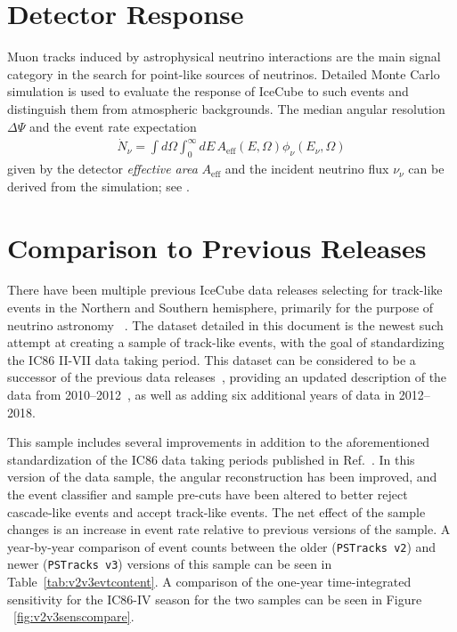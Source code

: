 \documentclass[aps,10pt,prd,twocolumn,floats,letterpaper,showpacs,nofootinbib,bibnotes,notitlepage,superscriptaddress,floatfix]{revtex4-1}
\newcommand{\MA}[1]{{\color{black}#1}}
\begin{document}

\section{Detector Response}\label{secIII}

Muon tracks induced by astrophysical neutrino interactions are the main signal category in the search for point-like sources of neutrinos. Detailed Monte Carlo simulation is used to evaluate the response of IceCube to such events and distinguish them from atmospheric backgrounds. The median angular resolution $\Delta\Psi$ and the event rate expectation
\begin{align}\label{eq:ev_rate}
\dot{N}_\nu=\int d\Omega\int_0^\infty dE\,A_\mathrm{eff}\left(E, \Omega\right) \phi_\nu\left(E_\nu,\Omega\right)
\end{align}
given by the detector \emph{effective area} $A_\mathrm{eff}$ and the incident neutrino flux $\nu_\nu$ can be derived from the simulation; see \cite{Aartsen:2016xlq}.

\section{Comparison to Previous Releases}\label{secIV}

There have been multiple previous IceCube data releases selecting for track-like events in the Northern and Southern hemisphere, primarily for the purpose of neutrino astronomy ~\cite{Abbasi:2010rd,Aartsen:2013uuv,IceCube:2018,IceCube:2019,IceCube:TXS2018}. The dataset detailed in this document is the newest such attempt at creating a sample of track-like events, with the goal of standardizing the IC86 II-VII data taking period. This dataset can be considered to be a successor of the previous data releases~\cite{IC40data,IC59data,IceCube:2018}, providing an updated description of the data from 2010--2012~\cite{IceCube:2018}, as well as adding six additional years of data in 2012--2018. 

This sample includes several improvements in addition to the aforementioned standardization of the IC86 data taking periods published in Ref.~\cite{IceCube:2018}. In this version of the data sample, the angular reconstruction has been improved, and the event classifier and sample pre-cuts have been altered to better reject cascade-like events and accept track-like events. The net effect of the sample changes is an increase in event rate relative to previous versions of the sample. A year-by-year comparison of event counts between the older \MA{({\tt PSTracks v2})} and newer \MA{({\tt PSTracks v3})} versions of this sample can be seen in Table~\ref{tab:v2v3evtcontent}. A comparison of the one-year time-integrated sensitivity for the IC86-IV season for the two samples can be seen in Figure ~\ref{fig:v2v3senscompare}. 
\end{document}
